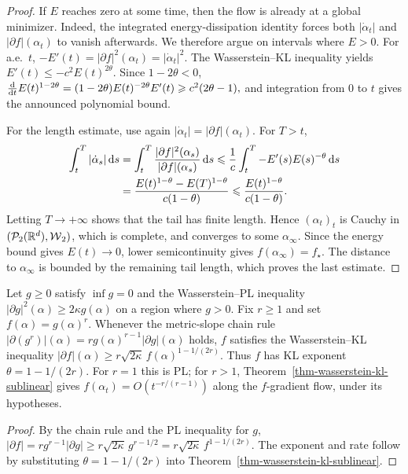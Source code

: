 \begin{proof}
If \(E\) reaches zero at some time, then the flow is already at a global minimizer. Indeed, the integrated energy-dissipation identity forces both \(|\dot\alpha_t|\) and \(|\partial f|(\alpha_t)\) to vanish afterwards. We therefore argue on intervals where \(E>0\). For a.e.\ \(t\),
\(-E'(t)=|\partial f|^2(\alpha_t)=|\dot\alpha_t|^2.\)
The Wasserstein--KL inequality yields
\(E'(t) \leq -c^2E(t)^{2\theta}\).
Since \(1-2\theta<0\), \(\frac{\mathrm{d}}{\mathrm{d} t}E(t)^{1-2\theta} = (1-2\theta)E(t)^{-2\theta}E'(t) \geqslant c^2(2\theta-1),\)
and integration from \(0\) to \(t\) gives the announced polynomial bound.

For the length estimate, use again \(|\dot\alpha_t|=|\partial f|(\alpha_t)\). For \(T>t\),
\[
\begin{aligned}
\int_t^T |\dot\alpha_s|\,\mathrm{d} s
&=
\int_t^T \frac{|\partial f|^2(\alpha_s)}{|\partial f|(\alpha_s)}\,\mathrm{d} s
\leqslant
\frac1c\int_t^T -E'(s)E(s)^{-\theta}\,\mathrm{d} s \\
&=
\frac{E(t)^{1-\theta}-E(T)^{1-\theta}}{c(1-\theta)}
\leqslant
\frac{E(t)^{1-\theta}}{c(1-\theta)}.
\end{aligned}
\]
Letting \(T\to+\infty\) shows that the tail has finite length. Hence \((\alpha_t)_t\) is Cauchy in \((\mathcal{P}_2(\mathbb{R}^d),\operatorname{\mathcal{W}}_2)\), which is complete, and converges to some \(\alpha_\infty\). Since the energy bound gives \(E(t)\to0\), lower semicontinuity gives \(f(\alpha_\infty)=f_\star\). The distance to \(\alpha_\infty\) is bounded by the remaining tail length, which proves the last estimate.
\end{proof}
\begin{prop}\label{prop-powers-pl-are-kl}
Let \(g\geq0\) satisfy \(\inf g=0\) and the Wasserstein--PL inequality
\(|\partial g|^2(\alpha) \geq 2\kappa g(\alpha)\)
on a region where \(g>0\). Fix \(r\geq1\) and set \(f(\alpha)=g(\alpha)^r\). Whenever the metric-slope chain rule \(|\partial(g^r)|(\alpha)=r g(\alpha)^{r-1}|\partial g|(\alpha)\) holds, \(f\) satisfies the Wasserstein--KL inequality
\(|\partial f|(\alpha) \geq r\sqrt{2\kappa}\, f(\alpha)^{1-1/(2r)}.\)
Thus \(f\) has KL exponent \(\theta=1-1/(2r)\). For \(r=1\) this is PL; for \(r>1\), Theorem~\ref{thm-wasserstein-kl-sublinear} gives \(f(\alpha_t)=O(t^{-r/(r-1)})\) along the \(f\)-gradient flow, under its hypotheses.
\end{prop}
\begin{proof}
By the chain rule and the PL inequality for \(g\), \(|\partial f| = rg^{r-1}|\partial g| \geq r\sqrt{2\kappa}\,g^{r-1/2} = r\sqrt{2\kappa}\,f^{1-1/(2r)}.\)
The exponent and rate follow by substituting \(\theta=1-1/(2r)\) into Theorem~\ref{thm-wasserstein-kl-sublinear}.
\end{proof}
